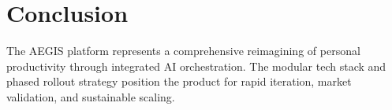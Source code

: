 \documentclass[11pt,oneside]{article}
\begin{document}
\section*{Conclusion}

The AEGIS platform represents a comprehensive reimagining of personal productivity through integrated AI orchestration. The modular tech stack and phased rollout strategy position the product for rapid iteration, market validation, and sustainable scaling.
\end{document}
